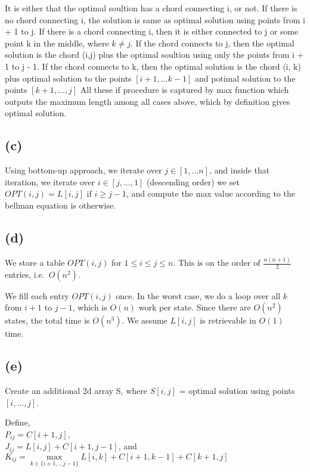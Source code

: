 It is either that the optimal soultion has a chord connecting i, or not.
If there is no chord connecting i, the solution is same as optimal solution using points from i + 1 to j.
If there is a chord connecting i, then it is either connected to j or some point k in the middle, where $k \neq j$.
If the chord connects to j, then the optimal solution is the chord (i,j) plus the optimal soultion using only the points from i + 1 to j - 1.
If the chord connects to k, then the optimal solution is the chord (i, k) plus optimal solution to the points $[i + 1, ... k - 1]$ and potimal solution to the points $[k + 1, ... ,j]$
All these if procedure is captured by max function which outputs the maximum length among all cases above, which by definition gives optimal solution.



\subsection*{(c)}

Using bottom-up approach, we iterate over $j \in [1, ... n]$, and inside that iteration, we iterate over $i \in [j, ... ,1]$ (descending order)
we set $OPT(i,j) = L[i,j]$ if $i \geq j - 1$, and compute the max value according to the bellman equation is otherwise.


\subsection*{(d)}

We store a table $OPT(i,j)$ for $1 \le i \le j \le n$. This is on the order of $\frac{n(n+1)}{2}$ entries, i.e.\ $O(n^2)$.

We fill each entry $OPT(i,j)$ once. In the worst case, we do a loop over all $k$ from $i+1$ to $j-1$, which is $O(n)$ work per state. Since there are $O(n^2)$ states, the total time is $O(n^3)$. We assume $L[i,j]$ is retrievable in $O(1)$ time.


\subsection*{(e)}

Create an additional 2d array S, where $S[i,j]$ = optimal solution using points $[i, ... ,j]$.

Define, \\
$P_{ij} = C[i + 1, j]$,\\ 
$J_{ij} = L[i,j] + C[i+1, j-1]$, and \\
$K_{ij} =  \max\limits_{k \in \{i + 1, ... j - 1\}} L[i,k] + C[i + 1, k - 1] + C[k + 1, j]$\\

